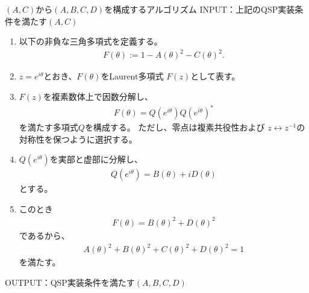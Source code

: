 \documentclass[a4paper,10.5pt]{article}
\numberwithin{equation}{section}
\begin{document}
\begin{setupbox}{$(A,C)$から$(A,B,C,D)$を構成するアルゴリズム}
    INPUT：上記のQSP実装条件を満たす$(A,C)$

    \begin{enumerate}
        \item 以下の非負な三角多項式を定義する。
        \begin{align*}
            F(\theta)
            :=
            1-A(\theta)^2-C(\theta)^2.
        \end{align*}

        \item $z=e^{i\theta}$とおき、$F(\theta)$をLaurent多項式
        $F(z)$として表す。

        \item $F(z)$を複素数体上で因数分解し、
        \begin{align*}
            F(\theta)
            =
            Q(e^{i\theta})Q(e^{i\theta})^{*}
        \end{align*}
        を満たす多項式$Q$を構成する。
        ただし、零点は複素共役性および
        $z\leftrightarrow z^{-1}$の対称性を保つように選択する。

        \item $Q(e^{i\theta})$を実部と虚部に分解し、
        \begin{align*}
            Q(e^{i\theta})
            =
            B(\theta)+iD(\theta)
        \end{align*}
        とする。

        \item このとき
        \begin{align*}
            F(\theta)
            =
            B(\theta)^2+D(\theta)^2
        \end{align*}
        であるから、
        \begin{align*}
            A(\theta)^2+B(\theta)^2
            +C(\theta)^2+D(\theta)^2
            =1
        \end{align*}
        を満たす。
    \end{enumerate}

    OUTPUT：QSP実装条件を満たす$(A,B,C,D)$
\end{setupbox}
\end{document}
